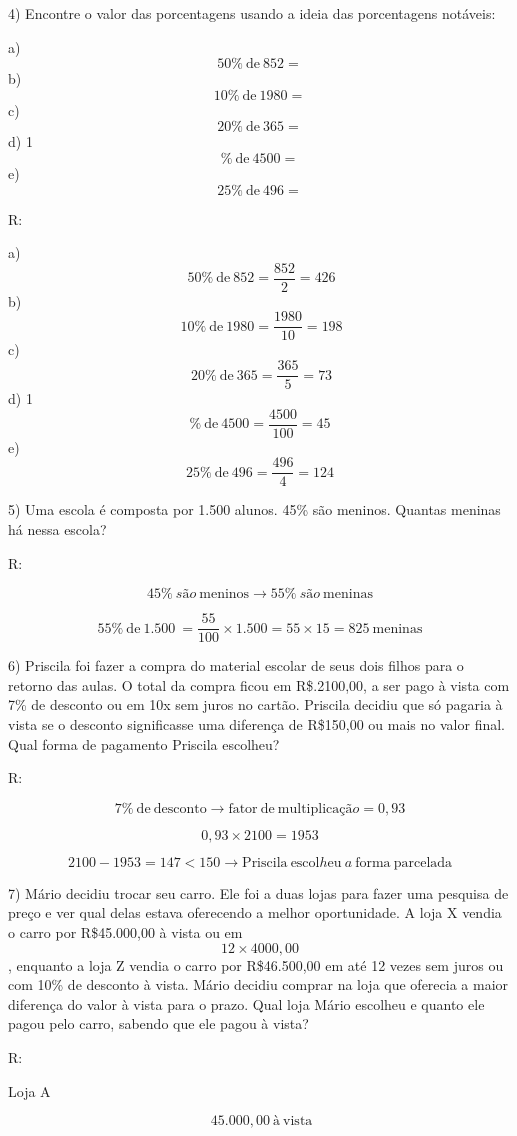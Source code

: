 4) Encontre o valor das porcentagens usando a ideia das porcentagens
notáveis:

a) \[50\%\ \text{de}\ 852 =\] b) \[10\%\ \text{de}\ 1980 =\] c)
\[20\%\ \text{de}\ 365 =\] d) 1\[\%\ \text{de}\ 4500 =\] e)
\[25\%\ \text{de}\ 496 =\]

R:

a) \[\ 50\%\ \text{de}\ 852 = \frac{852}{2} = 426\] b)
\[\ 10\%\ \text{de}\ 1980 = \frac{1980}{10} = 198\] c)
\[\ 20\%\ \text{de}\ 365 = \frac{365}{5} = 73\] d)
1\[\%\ \text{de}\ 4500 = \frac{4500}{100} = 45\] e)
\[25\%\ \text{de}\ 496 = \frac{496}{4} = 124\]

5) Uma escola é composta por 1.500 alunos. 45\% são meninos. Quantas
meninas há nessa escola?

R:

\[45\%\ são\ \text{meninos} \rightarrow 55\%\ são\ \text{meninas}\]

\[55\%\ \text{de}\ 1.500\  = \frac{55}{100} \times 1.500 = 55 \times 15 = 825\ \text{meninas}\]

6) Priscila foi fazer a compra do material escolar de seus dois filhos
para o retorno das aulas. O total da compra ficou em R\$.2100,00, a ser
pago à vista com 7\% de desconto ou em 10x sem juros no cartão. Priscila
decidiu que só pagaria à vista se o desconto significasse uma diferença
de R\$150,00 ou mais no valor final. Qual forma de pagamento Priscila
escolheu?

R:

\[7\%\ \text{de}\ \text{desconto} \rightarrow \text{fator}\ \text{de}\ \text{multiplica}ção = 0,93\]

\[0,93 \times 2100 = 1953\]

\[2100 - 1953 = 147 < 150 \rightarrow \text{Priscila}\ \text{escol}h\text{eu}\ a\ \text{forma}\ \text{parcelada}\]

7) Mário decidiu trocar seu carro. Ele foi a duas lojas para fazer uma
pesquisa de preço e ver qual delas estava oferecendo a melhor
oportunidade. A loja X vendia o carro por R\$45.000,00 à vista ou em
\[12 \times 4000,00\], enquanto a loja Z vendia o carro por R\$46.500,00
em até 12 vezes sem juros ou com 10\% de desconto à vista. Mário decidiu
comprar na loja que oferecia a maior diferença do valor à vista para o
prazo. Qual loja Mário escolheu e quanto ele pagou pelo carro, sabendo
que ele pagou à vista?

R:

Loja A

\[\ 45.000,00\ à\ \text{vista}\]

